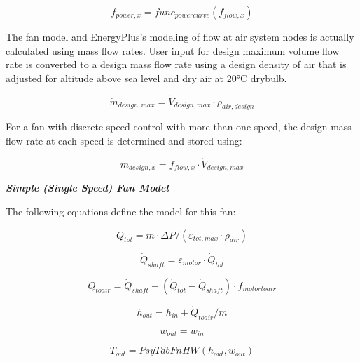 \begin{equation}
{f_{power,x}} =  {func_{power curve}}({f_{flow,x}})
\end{equation}

The fan model and EnergyPlus's modeling of flow at air system nodes is actually calculated using mass flow rates.  User input for design maximum volume flow rate is converted to a design mass flow rate using a design density of air that is adjusted for altitude above sea level and dry air at 20°C drybulb.

\begin{equation}
{\dot m_{design,max}} = {\dot V_{design, max}} \cdot  {\rho_{air,design}}
\end{equation}

For a fan with discrete speed control with more than one speed, the design mass flow rate at each speed is determined and stored using:

\begin{equation}
{\dot m_{design,x}} = {f_{flow,x}} \cdot {\dot V_{design,max}}
\end{equation}

\emph{\textbf{Simple (Single Speed) Fan Model}}

The following equations define the model for this fan:

\begin{equation}
{\dot Q_{tot}} = \dot m\cdot \Delta P/({\varepsilon_{tot,max}}\cdot {\rho_{air}})
\end{equation}

\begin{equation}
{\dot Q_{shaft}} = {\varepsilon_{motor}}\cdot {\dot Q_{tot}}
\end{equation}

\begin{equation}
{\dot Q_{toair}} = {\dot Q_{shaft}} + ({\dot Q_{tot}} - {\dot Q_{shaft}})\cdot {f_{motortoair}}
\end{equation}

\begin{equation}
{h_{out}} = {h_{in}} + {\dot Q_{toair}}/\dot m
\end{equation}

\begin{equation}
{w_{out}} = {w_{in}}
\end{equation}

\begin{equation}
{T_{out}} = PsyTdbFnHW({h_{out}},{w_{out}})
\end{equation}

